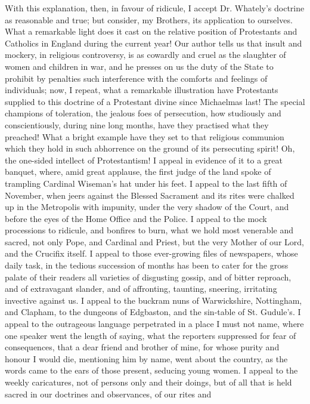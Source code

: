 With this explanation, then, in favour of ridicule, I accept Dr. Whately's doctrine as reasonable and true; but
consider, my Brothers, its application to ourselves. What
a remarkable light does it cast on the relative position
of Protestants and Catholics in England during the
current year! Our author tells us that insult and
mockery, in religious controversy, is as cowardly and
cruel as the slaughter of women and children in war, and
he presses on us the duty of the State to prohibit by
penalties such interference with the comforts and
feelings of individuals; now, I repeat, what a remarkable
illustration have Protestants supplied to this doctrine
of a Protestant divine since Michaelmas last! The special
champions of toleration, the jealous foes of persecution,
how studiously and conscientiously, during nine long
months, have they practised what they preached! What a
bright example have they set to that religious communion
which they hold in such abhorrence on the ground of its
persecuting spirit! Oh, the one-sided intellect of
Protestantism! I appeal in evidence of it to a great
banquet, where, amid great applause, the first judge of
the land spoke of trampling Cardinal Wiseman's hat under
his feet. I appeal to the last fifth of November, when
jeers against the Blessed Sacrament and its rites were
chalked up in the Metropolis with impunity, under the
very shadow of the Court, and before the eyes of the Home
Office and the Police. I appeal to the mock processions
to ridicule, and bonfires to burn, what we hold most
venerable and sacred, not only Pope, and Cardinal and
Priest, but the very Mother of our Lord, and the Crucifix
itself. I appeal to those ever-growing files of
newspapers, whose daily task, in the tedious succession of months has been to cater for the gross palate of their
readers all varieties of disgusting gossip, and of bitter
reproach, and of extravagant slander, and of affronting,
taunting, sneering, irritating invective against us. I
appeal to the buckram nuns of Warwickshire, Nottingham,
and Clapham, to the dungeons of Edgbaston, and the
sin-table of St. Gudule's. I appeal to the outrageous
language perpetrated in a place I must not name, where
one speaker went the length of saying, what the reporters
suppressed for fear of consequences, that a dear friend
and brother of mine, for whose purity and honour I would
die, mentioning him by name, went about the country, as
the words came to the ears of those present, seducing
young women. I appeal to the weekly caricatures, not of
persons only and their doings, but of all that is held
sacred in our doctrines and observances, of our rites and

